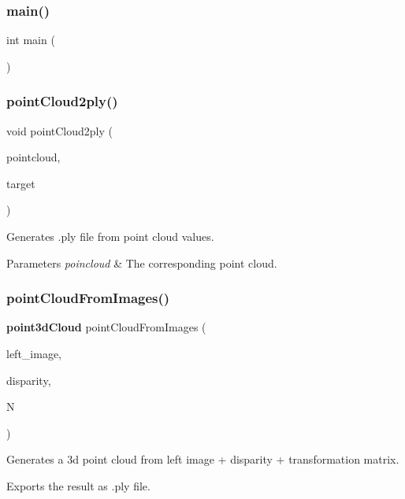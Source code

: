 \subsubsection{main()}
{\footnotesize\ttfamily int main (\begin{DoxyParamCaption}{ }\end{DoxyParamCaption})}

\mbox{\label{projet_8cpp_af2772ce8bedcf080a3be6bfd3e05a766}} 
\subsubsection{point\+Cloud2ply()}
{\footnotesize\ttfamily void point\+Cloud2ply (\begin{DoxyParamCaption}\item[{\textbf{ point3d\+Cloud}}]{pointcloud,  }\item[{string}]{target }\end{DoxyParamCaption})}



Generates .ply file from point cloud values. 


\begin{DoxyParams}{Parameters}
{\em poincloud} & The corresponding point cloud. \\
\hline
\end{DoxyParams}
\mbox{\label{projet_8cpp_aa05e86cf0d9cdd306e12c13dda746c75}} 
\subsubsection{point\+Cloud\+From\+Images()}
{\footnotesize\ttfamily \textbf{ point3d\+Cloud} point\+Cloud\+From\+Images (\begin{DoxyParamCaption}\item[{Mat \&}]{left\+\_\+image,  }\item[{const Mat \&}]{disparity,  }\item[{Matx33d}]{N }\end{DoxyParamCaption})}



Generates a 3d point cloud from left image + disparity + transformation matrix. 

Exports the result as .ply file.


